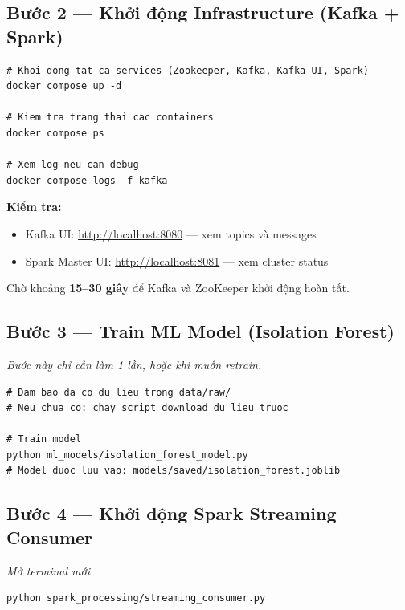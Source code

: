 \documentclass[12pt,a4paper]{article}
\begin{document}
\subsection{Bước 2 — Khởi động Infrastructure (Kafka + Spark)}

\begin{lstlisting}[style=bash, caption={Khởi động Docker services}]
# Khoi dong tat ca services (Zookeeper, Kafka, Kafka-UI, Spark)
docker compose up -d

# Kiem tra trang thai cac containers
docker compose ps

# Xem log neu can debug
docker compose logs -f kafka
\end{lstlisting}

\textbf{Kiểm tra:}
\begin{itemize}
  \item Kafka UI: \url{http://localhost:8080} — xem topics và messages
  \item Spark Master UI: \url{http://localhost:8081} — xem cluster status
\end{itemize}

Chờ khoảng \textbf{15--30 giây} để Kafka và ZooKeeper khởi động hoàn tất.

\subsection{Bước 3 — Train ML Model (Isolation Forest)}

\textit{Bước này chỉ cần làm 1 lần, hoặc khi muốn retrain.}

\begin{lstlisting}[style=bash, caption={Train Isolation Forest model}]
# Dam bao da co du lieu trong data/raw/
# Neu chua co: chay script download du lieu truoc

# Train model
python ml_models/isolation_forest_model.py
# Model duoc luu vao: models/saved/isolation_forest.joblib
\end{lstlisting}

\subsection{Bước 4 — Khởi động Spark Streaming Consumer}

\textit{Mở terminal mới.}

\begin{lstlisting}[style=bash, caption={Chạy Spark Streaming Consumer}]
python spark_processing/streaming_consumer.py
\end{lstlisting}
\end{document}

